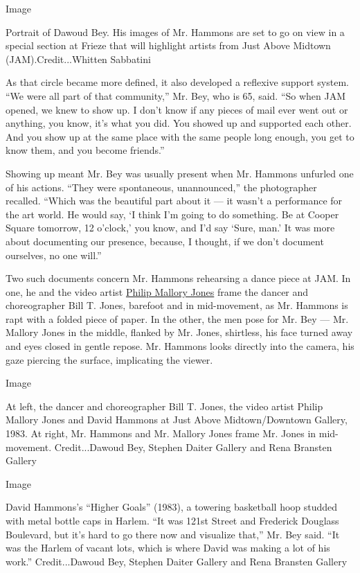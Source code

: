 Image

Portrait of Dawoud Bey. His images of Mr. Hammons are set to go on view
in a special section at Frieze that will highlight artists from Just
Above Midtown (JAM).Credit...Whitten Sabbatini

As that circle became more defined, it also developed a reflexive
support system. ``We were all part of that community,'' Mr. Bey, who is
65, said. ``So when JAM opened, we knew to show up. I don't know if any
pieces of mail ever went out or anything, you know, it's what you did.
You showed up and supported each other. And you show up at the same
place with the same people long enough, you get to know them, and you
become friends.''

Showing up meant Mr. Bey was usually present when Mr. Hammons unfurled
one of his actions. ``They were spontaneous, unannounced,'' the
photographer recalled. ``Which was the beautiful part about it --- it
wasn't a performance for the art world. He would say, `I think I'm going
to do something. Be at Cooper Square tomorrow, 12 o'clock,' you know,
and I'd say `Sure, man.' It was more about documenting our presence,
because, I thought, if we don't document ourselves, no one will.''

Two such documents concern Mr. Hammons rehearsing a dance piece at JAM.
In one, he and the video artist
\href{https://philipmalloryjones.com/}{Philip Mallory Jones} frame the
dancer and choreographer Bill T. Jones, barefoot and in mid-movement, as
Mr. Hammons is rapt with a folded piece of paper. In the other, the men
pose for Mr. Bey --- Mr. Mallory Jones in the middle, flanked by Mr.
Jones, shirtless, his face turned away and eyes closed in gentle repose.
Mr. Hammons looks directly into the camera, his gaze piercing the
surface, implicating the viewer.

Image

At left, the dancer and choreographer Bill T. Jones, the video artist
Philip Mallory Jones and David Hammons at Just Above Midtown/Downtown
Gallery, 1983. At right, Mr. Hammons and Mr. Mallory Jones frame Mr.
Jones in mid-movement. Credit...Dawoud Bey, Stephen Daiter Gallery and
Rena Bransten Gallery

Image

David Hammons's ``Higher Goals'' (1983), a towering basketball hoop
studded with metal bottle caps in Harlem. ``It was 121st Street and
Frederick Douglass Boulevard, but it's hard to go there now and
visualize that,'' Mr. Bey said. ``It was the Harlem of vacant lots,
which is where David was making a lot of his work.'' Credit...Dawoud
Bey, Stephen Daiter Gallery and Rena Bransten Gallery

